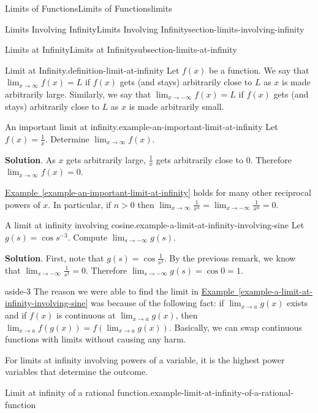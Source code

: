 \documentclass[oneside,10pt,]{book}
\numberwithin{equation}{section}
\begin{document}
\begin{chapterptx}{Limits of Functions}{}{Limits of Functions}{}{}{limits}
\begin{sectionptx}{Limits Involving Infinity}{}{Limits Involving Infinity}{}{}{section-limits-involving-infinity}
\begin{subsectionptx}{Limits at Infinity}{}{Limits at Infinity}{}{}{subsection-limits-at-infinity}
\begin{definition}{Limit at Infinity.}{definition-limit-at-infinity}
\hypertarget{p-60}{}%
Let \(f(x)\) be a function. We say that \(\lim_{x\to\infty}f(x) = L\) if \(f(x)\) gets (and stays) arbitrarily close to \(L\) as \(x\) is made arbitrarily large. Similarly, we say that \(\lim_{x\to-\infty}f(x) = L\) if \(f(x)\) gets (and stays) arbitrarily close to \(L\) as \(x\) is made arbitrarily small.%
\end{definition}
\begin{example}{An important limit at infinity.}{example-an-important-limit-at-infinity}%
\hypertarget{p-61}{}%
Let \(f(x) = \frac{1}{x}\). Determine \(\lim_{x\to\infty}f(x)\).%
\par\smallskip%
\noindent\textbf{Solution}.\hypertarget{solution-12}{}\quad%
\hypertarget{p-62}{}%
As \(x\) gets arbitrarily large, \(\frac{1}{x}\) gets arbitrarily close to \(0\). Therefore \(\lim_{x\to\infty}f(x) = 0\).%
\end{example}
\hypertarget{p-63}{}%
\hyperref[example-an-important-limit-at-infinity]{Example~\ref{example-an-important-limit-at-infinity}} holds for many other reciprocal powers of \(x\). In particular, if \(n>0\) then \(\lim_{x\to\infty}\frac{1}{x^{n}} = \lim_{x\to-\infty}\frac{1}{x^{n}} = 0\).%
\begin{example}{A limit at infinity involving cosine.}{example-a-limit-at-infinity-involving-sine}%
\hypertarget{p-64}{}%
Let \(g(s) = \cos s^{-3}\). Compute \(\lim_{s\to-\infty}g(s)\).%
\par\smallskip%
\noindent\textbf{Solution}.\hypertarget{solution-13}{}\quad%
\hypertarget{p-65}{}%
First, note that \(g(s) = \cos\frac{1}{s^{3}}\). By the previous remark, we know that \(\lim_{s\to-\infty}\frac{1}{s^{3}} = 0\). Therefore \(\lim_{s\to-\infty}g(s) = \cos0 = 1\).%
\end{example}
\begin{aside}{}{aside-3}%
\hypertarget{p-66}{}%
The reason we were able to find the limit in \hyperref[example-a-limit-at-infinity-involving-sine]{Example~\ref{example-a-limit-at-infinity-involving-sine}} was because of the following fact: if \(\lim_{x\to a}g(x)\) exists and if \(f(x)\) is continuous at \(\lim_{x\to a}g(x)\), then \(\lim_{x\to a}f(g(x)) = f(\lim_{x\to a}g(x))\). Basically, we can swap continuous functions with limits without causing any harm.%
\end{aside}
\hypertarget{p-67}{}%
For limits at infinity involving powers of a variable, it is the highest power variables that determine the outcome.%
\begin{example}{Limit at infinity of a rational function.}{example-limit-at-infinity-of-a-rational-function}%

\end{example}
\end{subsectionptx}
\end{sectionptx}
\end{chapterptx}
\end{document}
